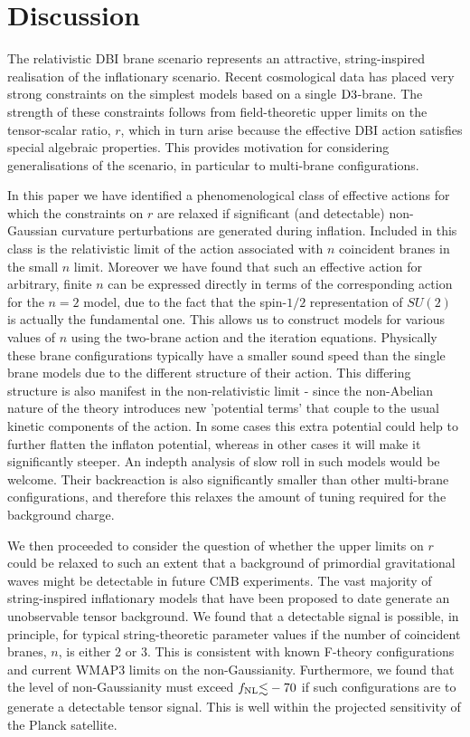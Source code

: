 {\section{Discussion}

The relativistic DBI brane scenario represents an attractive, 
string-inspired realisation of the inflationary scenario. Recent
cosmological data has placed very strong constraints on the simplest 
models based on a single ${\rm D3}$-brane. The strength 
of these constraints follows from field-theoretic upper limits 
on the tensor-scalar ratio, $r$, which in turn arise because 
the effective DBI action satisfies special  
algebraic properties. This provides motivation 
for considering generalisations of the scenario, in particular to 
multi-brane configurations. 

In this paper we have identified a phenomenological class of 
effective actions for which the constraints 
on $r$ are relaxed if significant (and detectable) 
non-Gaussian curvature perturbations are generated during inflation. 
Included in this class is the relativistic limit of the 
action associated with $n$ 
coincident branes in the small $n$ limit. Moreover 
we have found that such an effective action for arbitrary, finite $n$ 
can be expressed directly in terms of the corresponding action 
for the $n = 2$ model, due to the fact that the spin-$1/2$ representation
of $SU(2)$ is actually the fundamental one. This allows us to construct models for various values of
$n$ using the
two-brane action and the iteration equations.
Physically these brane configurations typically 
have a smaller sound speed than the single brane models due to
the different structure of their action. This differing structure is also
manifest in the non-relativistic limit - since the non-Abelian nature of the theory
introduces new 'potential terms' that couple to the usual kinetic components of the 
action. In some cases this extra potential could help to further flatten the inflaton potential, 
whereas in other cases it will make it significantly steeper. An indepth analysis of slow roll in
such models would be welcome.
Their backreaction is also significantly smaller than other multi-brane 
configurations, and therefore this relaxes the amount of tuning 
required for the background charge.

We then proceeded to consider the question of whether the upper limits on 
$r$ could be relaxed to such an extent 
that a background of primordial gravitational waves 
might be detectable in future CMB experiments. The vast majority of 
string-inspired inflationary models that have been proposed to date 
generate an unobservable tensor background. We 
found that a detectable signal is possible, in principle, 
for typical string-theoretic parameter values 
if the number of coincident branes, $n$, is either $2$ or $3$. 
This is consistent with known F-theory configurations and 
current WMAP3 limits on the non-Gaussianity. Furthermore, 
we found that the level of non-Gaussianity must exceed $\fnl 
\lsim -70$ if such configurations are to generate a detectable tensor 
signal. This is well within the projected sensitivity 
of the Planck satellite.   

}
